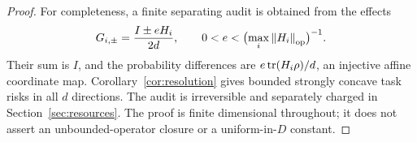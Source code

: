 \begin{proof}
For completeness, a finite separating audit is obtained from the effects
\[
 G_{i,\pm}=\frac{I\pm eH_i}{2d},\qquad
 0<e<\bigl(\max_i\left\lVert H_i\right\rVert_{\rm op}\bigr)^{-1}.
\]
Their sum is $I$, and the probability differences are $e\operatorname{tr}(H_i\rho)/d$, an injective affine coordinate map. Corollary~\ref{cor:resolution} gives bounded strongly concave task risks in all $d$ directions. The audit is irreversible and separately charged in Section~\ref{sec:resources}. The proof is finite dimensional throughout; it does not assert an unbounded-operator closure or a uniform-in-$D$ constant.
\end{proof}
